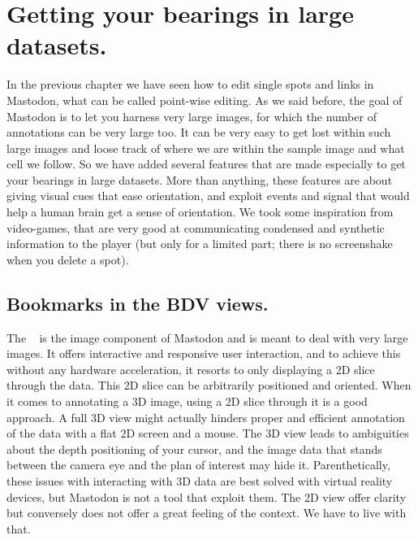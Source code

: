 \section{Getting your bearings in large datasets.}

In the previous chapter we have seen how to edit single spots and links in Mastodon, what can be called point-wise editing.
As we said before, the goal of Mastodon is to let you harness very large images, for which the number of annotations can be very large too.
It can be very easy to get lost within such large images and loose track of where we are within the sample image and what cell we follow. 
So we have added several features that are made especially to get your bearings in large datasets.
More than anything, these features are about giving visual cues that ease orientation, and exploit events and signal that would help a human brain get a sense of orientation. 
We took some inspiration from video-games, that are very good at communicating condensed and synthetic information to the player
(but only for a limited part; there is no screenshake when you delete a spot).


\subsection{Bookmarks in the BDV views.}

The \bdv~\cite{bdv} is the image component of Mastodon and is meant to deal with very large images.
It offers interactive and responsive user interaction, and to achieve this without any hardware acceleration, it resorts to only displaying a 2D slice through the data.
This 2D slice can be arbitrarily positioned and oriented. 
When it comes to annotating a 3D image, using a 2D slice through it is a good approach. 
A full 3D view might actually hinders proper and efficient annotation of the data with a flat 2D screen and a mouse. 
The 3D view leads to ambiguities about the depth positioning of your cursor, and the image data that stands between the camera eye and the plan of interest may hide it.
Parenthetically, these issues with interacting with 3D data are best solved with virtual reality devices, but Mastodon is not a tool that exploit them.
The 2D view offer clarity but conversely does not offer a great feeling of the context. 
We have to live with that.


